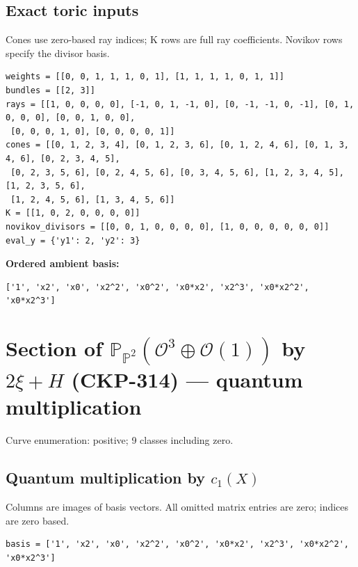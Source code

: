 \documentclass[10pt,a4paper]{article}
\begin{document}
\subsection*{Exact toric inputs}
Cones use zero-based ray indices; K rows are full ray coefficients. Novikov rows specify the divisor basis.

\begin{lstlisting}
weights = [[0, 0, 1, 1, 1, 0, 1], [1, 1, 1, 1, 0, 1, 1]]
bundles = [[2, 3]]
rays = [[1, 0, 0, 0, 0], [-1, 0, 1, -1, 0], [0, -1, -1, 0, -1], [0, 1, 0, 0, 0], [0, 0, 1, 0, 0],
 [0, 0, 0, 1, 0], [0, 0, 0, 0, 1]]
cones = [[0, 1, 2, 3, 4], [0, 1, 2, 3, 6], [0, 1, 2, 4, 6], [0, 1, 3, 4, 6], [0, 2, 3, 4, 5],
 [0, 2, 3, 5, 6], [0, 2, 4, 5, 6], [0, 3, 4, 5, 6], [1, 2, 3, 4, 5], [1, 2, 3, 5, 6],
 [1, 2, 4, 5, 6], [1, 3, 4, 5, 6]]
K = [[1, 0, 2, 0, 0, 0, 0]]
novikov_divisors = [[0, 0, 1, 0, 0, 0, 0], [1, 0, 0, 0, 0, 0, 0]]
eval_y = {'y1': 2, 'y2': 3}
\end{lstlisting}

\textbf{Ordered ambient basis:}
\begin{lstlisting}
['1', 'x2', 'x0', 'x2^2', 'x0^2', 'x0*x2', 'x2^3', 'x0*x2^2', 'x0*x2^3']
\end{lstlisting}

\clearpage\section*{Section of $\mathbb P_{\mathbb P^{2}}(\mathcal O^{3}\oplus \mathcal O(1))$ by $2\xi +H$ (CKP-314) --- quantum multiplication}

Curve enumeration: positive; 9 classes including zero.
\subsection*{Quantum multiplication by $c_1(X)$}
Columns are images of basis vectors. All omitted matrix entries are zero; indices are zero based.

\begin{lstlisting}
basis = ['1', 'x2', 'x0', 'x2^2', 'x0^2', 'x0*x2', 'x2^3', 'x0*x2^2', 'x0*x2^3']
\end{lstlisting}
\end{document}
